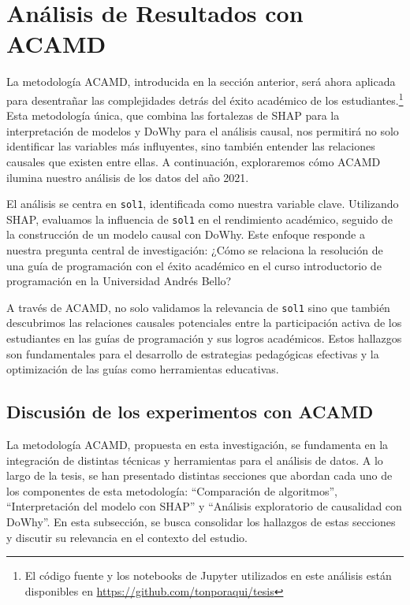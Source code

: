 \section{Análisis de Resultados con ACAMD}\label{analisis_resultados_acamd}
La metodología ACAMD, introducida en la sección anterior, será ahora aplicada para desentrañar las complejidades detrás del éxito académico de los estudiantes.\footnote{El código fuente y los notebooks de Jupyter utilizados en este análisis están disponibles en \url{https://github.com/tonporaqui/tesis}} Esta metodología única, que combina las fortalezas de SHAP para la interpretación de modelos y DoWhy para el análisis causal, nos permitirá no solo identificar las variables más influyentes, sino también entender las relaciones causales que existen entre ellas. A continuación, exploraremos cómo ACAMD ilumina nuestro análisis de los datos del año 2021.

El análisis se centra en \texttt{sol1}, identificada como nuestra variable clave. Utilizando SHAP, evaluamos la influencia de \texttt{sol1} en el rendimiento académico, seguido de la construcción de un modelo causal con DoWhy. Este enfoque responde a nuestra pregunta central de investigación: ¿Cómo se relaciona la resolución de una guía de programación con el éxito académico en el curso introductorio de programación en la Universidad Andrés Bello?

A través de ACAMD, no solo validamos la relevancia de \texttt{sol1} sino que también descubrimos las relaciones causales potenciales entre la participación activa de los estudiantes en las guías de programación y sus logros académicos. Estos hallazgos son fundamentales para el desarrollo de estrategias pedagógicas efectivas y la optimización de las guías como herramientas educativas.











\subsection{Discusión de los experimentos con ACAMD}

La metodología ACAMD, propuesta en esta investigación, se fundamenta en la integración de distintas técnicas y herramientas para el análisis de datos. A lo largo de la tesis, se han presentado distintas secciones que abordan cada uno de los componentes de esta metodología: ``Comparación de algoritmos'', ``Interpretación del modelo con SHAP'' y ``Análisis exploratorio de causalidad con DoWhy''. En esta subsección, se busca consolidar los hallazgos de estas secciones y discutir su relevancia en el contexto del estudio.


